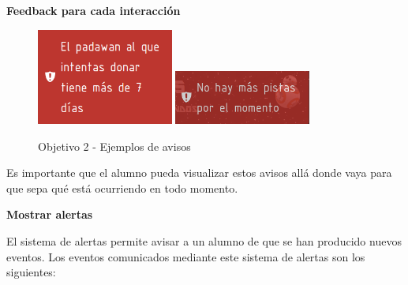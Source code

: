 \textbf{Feedback para cada interacción}
\begin{figure}[ht]
	\centering
	\includegraphics[width=0.4\textwidth]{imagenes/Objetivo2_new.png}
	\includegraphics[width=0.4\textwidth]{imagenes/Objetivo2b_new.png}
	\caption{Objetivo 2 - Ejemplos de avisos}
	\label{objetivoIm2}
\end{figure}

Es importante que el alumno pueda visualizar estos avisos allá donde vaya para que sepa qué está ocurriendo en todo momento.

\textbf{Mostrar alertas}

El sistema de alertas permite avisar a un alumno de que se han producido nuevos eventos. Los eventos comunicados mediante este sistema de alertas son los siguientes:\\

